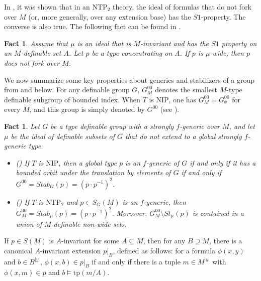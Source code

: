 \documentclass[12pt]{article}
\newcommand{\tpp}{\mathrm{tp}}
\newcommand{\NIP}{\mathrm{NIP}}
\newcommand{\NTP}{\mathrm{NTP_2}}
\newcommand{\0}{\emptyset}
\newcommand{\U}{\mathcal{U}}
\theoremstyle{plain}%
\newtheorem{fact}[thm]{Fact}
\theoremstyle{definition}
\theoremstyle{remark}
\begin{document}
In \cite{BYC14}, it was shown that in an $\NTP$ theory, the ideal of formulas that do not fork over $M$ (or, more generally, over any extension base) has the $S1$-property. The converse is also true. The following fact can be found in \cite{Hru12}.
\begin{fact}\label{S_1_wide_implies_nonforking} Assume that $\mu$ is an ideal that is $M$-invariant and has the $S1$ property on an $M$-definable set $A$. Let $p$ be a type concentrating on $A$. If $p$ is $\mu$-wide, then $p$ does not fork over $M$.
\end{fact}
We now summarize some key properties about generics and stabilizers of a group from \cite{CS18} and \cite{MOS20} below. For any definable group $G$, $G_M^{00}$ denotes the smallest $M$-type definable subgroup of bounded index. When $T$ is $\NIP$, one has $G_M^{00}=G
_{\emptyset}^{00}$ for every $M$, and this group is simply denoted by $G^{00}$ (see \cite[Theorem 8.4]{NIPbook}).

\begin{fact}\label{genericity} Let $G$ be a type definable group with a  strongly $f$-generic over $M$, and let $\mu$ be the ideal of definable subsets of $G$ that do not extend to a global strongly $f$-generic type.
\begin{itemize}
    \item[(i)](\cite[Proposition 3.8]{CS18}) If $T$ is $\NIP$, then a global type $p$ is an $f$-generic of $G$ if and only if it has a bounded orbit under the translation by elements of $G$ if and only if $G^{00}=Stab_G(p)=(p\cdot p^{-1})^2$. %
    \item[(ii)](\cite[Theorem 3.18]{MOS20}) If $T$ is $\NTP$ and $p\in S_G(M)$ is an $f$-generic, then $G_M^{00}=Stab_{\mu}(p)=(p\cdot p^{-1})^2$. Moreover, $G_M^{00}\setminus St_{\mu}(p)$ is contained in a union of $M$-definable non-wide sets.
\end{itemize}
    
\end{fact}

If $p \in S(M)$ is $A$-invariant for some $A \subseteq M$, then for any $B \supseteq M$, there is a canonical $A$-invariant extension $p|_{B}$, defined as follows: for a formula $\phi(x,y)$ and $b \in  B^{|y|}$, $\phi(x,b)\in p|_B$ if and only if there is a tuple $m\in M^{|y|}$ with $\phi(x,m)\in p$ and $b\models \tpp(m/A)$. 
\end{document}
